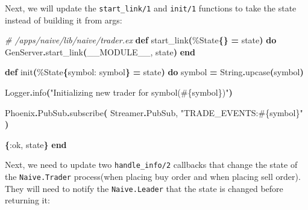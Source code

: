 \documentclass[
  oneside]{book}
\newenvironment{Shaded}{\begin{snugshade}}{\end{snugshade}}
\newcommand{\CommentTok}[1]{\textcolor[rgb]{0.56,0.35,0.01}{\textit{#1}}}
\newcommand{\ConstantTok}[1]{\textcolor[rgb]{0.56,0.35,0.01}{#1}}
\newcommand{\FunctionTok}[1]{\textcolor[rgb]{0.13,0.29,0.53}{\textbf{#1}}}
\newcommand{\KeywordTok}[1]{\textcolor[rgb]{0.13,0.29,0.53}{\textbf{#1}}}
\newcommand{\NormalTok}[1]{#1}
\newcommand{\OperatorTok}[1]{\textcolor[rgb]{0.81,0.36,0.00}{\textbf{#1}}}
\newcommand{\OtherTok}[1]{\textcolor[rgb]{0.56,0.35,0.01}{#1}}
\newcommand{\StringTok}[1]{\textcolor[rgb]{0.31,0.60,0.02}{#1}}
\newcommand{\VariableTok}[1]{\textcolor[rgb]{0.00,0.00,0.00}{#1}}
\begin{document}
Next, we will update the \texttt{start\_link/1} and \texttt{init/1} functions to take the state instead of building it from args:

\begin{Shaded}
\begin{Highlighting}[]
  \CommentTok{\# /apps/naive/lib/naive/trader.ex}
  \KeywordTok{def}\NormalTok{ start\_link}\FunctionTok{(}\NormalTok{\%}\ConstantTok{State}\FunctionTok{\{\}} \OperatorTok{=}\NormalTok{ state}\FunctionTok{)} \KeywordTok{do}
    \ConstantTok{GenServer}\OperatorTok{.}\NormalTok{start\_link}\FunctionTok{(}\ConstantTok{\_\_MODULE\_\_}\NormalTok{, state}\FunctionTok{)}
  \KeywordTok{end}

  \KeywordTok{def}\NormalTok{ init}\FunctionTok{(}\NormalTok{\%}\ConstantTok{State}\FunctionTok{\{}\VariableTok{symbol:}\NormalTok{ symbol}\FunctionTok{\}} \OperatorTok{=}\NormalTok{ state}\FunctionTok{)} \KeywordTok{do}
\NormalTok{    symbol }\OperatorTok{=} \ConstantTok{String}\OperatorTok{.}\NormalTok{upcase}\FunctionTok{(}\NormalTok{symbol}\FunctionTok{)}

    \ConstantTok{Logger}\OperatorTok{.}\NormalTok{info}\FunctionTok{(}\StringTok{"Initializing new trader for symbol(}\OtherTok{\#\{}\NormalTok{symbol}\OtherTok{\}}\StringTok{)"}\FunctionTok{)}

    \ConstantTok{Phoenix}\OperatorTok{.}\ConstantTok{PubSub}\OperatorTok{.}\NormalTok{subscribe}\FunctionTok{(}
      \ConstantTok{Streamer}\OperatorTok{.}\ConstantTok{PubSub}\NormalTok{,}
      \StringTok{"TRADE\_EVENTS:}\OtherTok{\#\{}\NormalTok{symbol}\OtherTok{\}}\StringTok{"}
    \FunctionTok{)}

    \FunctionTok{\{}\VariableTok{:ok}\NormalTok{, state}\FunctionTok{\}}
  \KeywordTok{end}
\end{Highlighting}
\end{Shaded}

Next, we need to update two \texttt{handle\_info/2} callbacks that change the state of the \texttt{Naive.Trader} process(when placing buy order and when placing sell order). They will need to notify the \texttt{Naive.Leader} that the state is changed before returning it:
\end{document}
